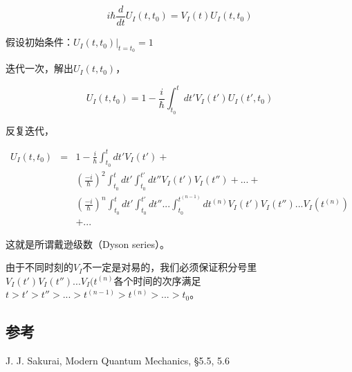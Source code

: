\begin{equation}
i \hbar \frac{d}{dt } U_I (t, t_0) = V_I (t) U_I(t, t_0)
\end{equation}

假设初始条件：$U_I(t, t_0)|_{t = t_0} = 1$

迭代一次，解出$U_I(t, t_0)$，

\begin{equation}
U_I(t, t_0) = 1 - \frac{i}{\hbar} \int_{t_0}^t dt' V_I(t') U_I (t', t_0) 
\end{equation}

反复迭代，

\begin{eqnarray*}
U_I(t, t_0) & = & 1 - \frac{i}{\hbar}\int_{t_0}^t dt' V_I(t') +  \\
{} & {} & \left(\frac{-i}{\hbar} \right)^2 \int_{t_0}^t dt' \int_{t_0}^{t'} dt'' V_I (t') V_I(t'') + ... +  \\
{} & {} &  \left(\frac{-i}{\hbar} \right)^n \int_{t_0}^t dt' \int_{t_0}^{t'} dt'' ... \int_{t_0}^{t^{(n-1)}} dt^{(n)} V_I(t') V_I (t'')... V_I(t^{(n)}) \\
{} &  {}  & + ... 
\end{eqnarray*}

这就是所谓戴逊级数（Dyson series）。

由于不同时刻的$V_I$不一定是对易的，我们必须保证积分号里$V_I(t') V_I (t'')... V_I(t^{(n)}$各个时间的次序满足$t > t' > t'' > ... > t^{(n-1)} > t^{(n)} >... > t_0$。

\subsection*{参考}

J. J. Sakurai, Modern Quantum Mechanics, \S 5.5, 5.6